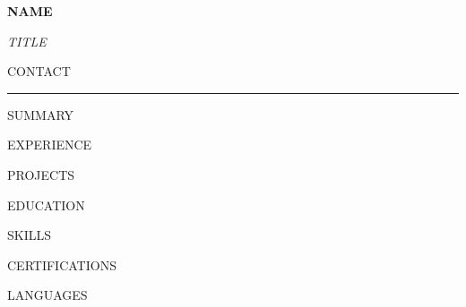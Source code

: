 \documentclass[11pt]{article}
\begin{document}
\begin{center}
  {\LARGE\bfseries\color{ink} {{NAME}}}\par
  \vspace{0.15em}
  {\large\itshape\color{accent} {{TITLE}}}\par
  \vspace{0.3em}
  {\small\color{ink} {{CONTACT}}}
\end{center}
\vspace{0.2em}
{\color{gold}\rule{\textwidth}{1pt}}
\vspace{0.15em}

{{SUMMARY}}

{{EXPERIENCE}}

{{PROJECTS}}

{{EDUCATION}}

{{SKILLS}}

{{CERTIFICATIONS}}

{{LANGUAGES}}
\end{document}
